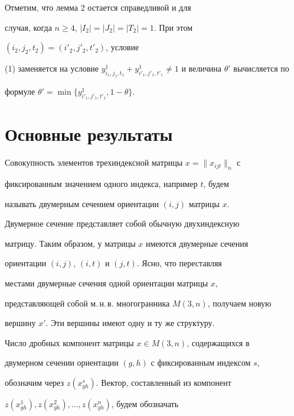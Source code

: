 \begin{note}


Отметим, что лемма 2 остается справедливой и для


случая, когда $n\geq 4$, $|I_2|=|J_2|=|T_2|=1$. При этом


$(i_2,j_2,t_2)=(i'_2,j'_2,t'_2)$, условие


(1) заменяется на условие $y_{i_1,j_1,t_1}^1 +


y^1_{i'_1,j'_1,t'_1} \neq 1$ и величина $\theta'$ вычисляется по


формуле $\theta'=\min \{y_{i'_1,j'_1,t'_1}^1 , 1-\theta \}$.


\end{note}








\section{Основные результаты}





Совокупность элементов трехиндексной матрицы $x=\|x_{ijt}\|_n$ с


фиксированным значением одного индекса, например $t$, будем


называть двумерным сечением ориентации $(i,j)$ матрицы $x$.


Двумерное сечение представляет собой обычную двухиндексную


матрицу. Таким образом, у матрицы $x$ имеются двумерные сечения


ориентации $(i,j)$, $(i,t)$ и $(j,t)$. Ясно, что переставляя


местами двумерные сечения одной ориентации матрицы $x$,


представляющей собой м.\,н.\,в. многогранника $M(3,n)$, получаем новую


вершину $x'$. Эти вершины имеют одну и ту же структуру.





Число дробных компонент матрицы $x\in M(3,n)$, содержащихся в


двумерном сечении ориентации $(g,h)$ с фиксированным индексом $s$,


обозначим через $z(x^s_{gh})$. Вектор, составленный из компонент


$z(x^1_{gh}), z(x^2_{gh}), \dotsc, z(x^n_{gh})$, будем обозначать


